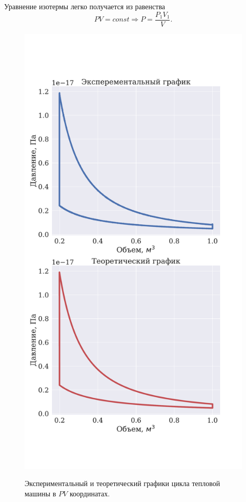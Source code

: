 \documentclass[twoside,twocolumn, 11pt]{article}
\theoremstyle{plain}
\theoremstyle{definition}
\begin{document}
Уравнение изотермы легко получается из равенства
$$PV = const \Rightarrow P = \dfrac{P_1 V_1}{V}.$$
\begin{figure}[!h]
{\includegraphics[width=1\linewidth]{cycle}}
\caption{Экспериментальный и теоретический графики цикла тепловой машины в $PV$ координатах.}
\end{figure}
\end{document}
